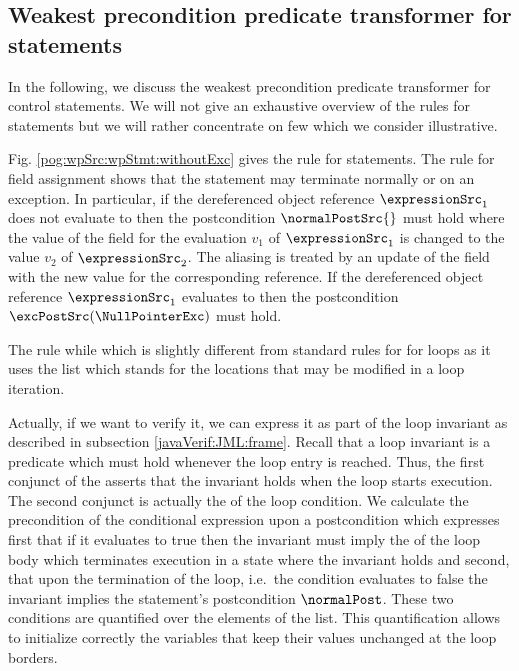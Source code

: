 
\subsection{Weakest precondition predicate transformer for statements}\label{pog:wpSrc:wpStmt}

In the following, we discuss  the weakest precondition predicate transformer for  control statements.
 We will not give an exhaustive overview of the \wpName{} rules for statements 
but we will rather  concentrate on few which we consider illustrative. 

Fig. \ref{pog:wpSrc:wpStmt:withoutExc} gives  the rule for statements. The rule for field assignment shows that the statement may terminate normally or on an exception. 
In particular, if the  dereferenced object reference $\expressionSrc_1$ does not evaluate to \Mynull{} 
 then  the postcondition $\normalPostSrc{}$ must hold where the value of the field \fieldd{} for the 
evaluation $v_1$ of $\expressionSrc_1$ is changed to the value  $v_2$ of  $\expressionSrc_2$. 
The aliasing is treated by an update of the field with the new value for the corresponding reference. 
If  the  dereferenced object reference $\expressionSrc_1$  evaluates to \Mynull{} then the postcondition 
$ \excPostSrc(\NullPointerExc) $ must hold.


The rule \textsf{while} which is slightly different from 
standard rules for \wpName{} for loops as it uses the list \modLoop{}  which stands for the locations that may be modified  in a loop iteration. 

 Actually, if we want to verify   it, we can express it as part of the loop invariant as described in subsection \ref{javaVerif:JML:frame}.
 Recall that a loop invariant  is a predicate which must hold whenever the loop entry is reached.
Thus, the first conjunct of the \wpName{} asserts that the invariant \invariant{} holds when the loop starts execution. 
The second conjunct is actually the \wpName{}  of the loop condition. We calculate the precondition of 
 the conditional expression upon a postcondition which expresses first that if it evaluates to true then the invariant must imply the \wpName{} of the loop body which terminates
 execution in a state where  the invariant holds and second, that upon the termination of the loop, i.e.\ the condition evaluates to false the invariant implies the 
statement's postcondition $\normalPost$.  These two conditions  are quantified over the 
elements of the \modLoop{} list. This quantification allows to initialize correctly the variables that keep their values unchanged at the loop borders.


